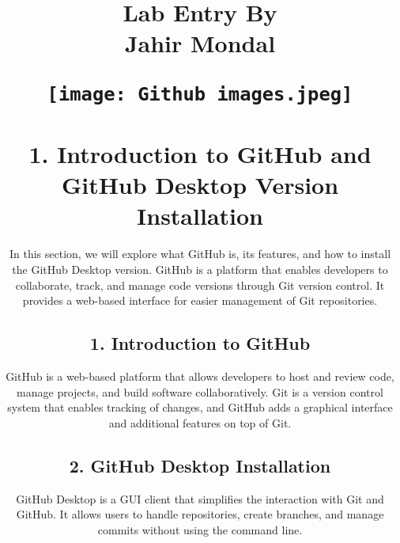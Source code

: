 \documentclass[a4paper,12pt]{article}
\begin{document}
\newpage
\usetikzlibrary{calc}

\title{Lab Entry By\\[0.5cm] \large Jahir Mondal\\[0.5cm]
    \begin{figure}
    \centering
    \texttt{[image: Github images.jpeg]} %
\end{figure}
\author{}
\date{}

\maketitle
\section*{1. Introduction to GitHub and GitHub Desktop Version Installation}

In this section, we will explore what GitHub is, its features, and how to install the GitHub Desktop version. GitHub is a platform that enables developers to collaborate, track, and manage code versions through Git version control. It provides a web-based interface for easier management of Git repositories.

\subsection*{1. Introduction to GitHub}
GitHub is a web-based platform that allows developers to host and review code, manage projects, and build software collaboratively. Git is a version control system that enables tracking of changes, and GitHub adds a graphical interface and additional features on top of Git.

\subsection*{2. GitHub Desktop Installation}
GitHub Desktop is a GUI client that simplifies the interaction with Git and GitHub. It allows users to handle repositories, create branches, and manage commits without using the command line.

}
\end{document}
